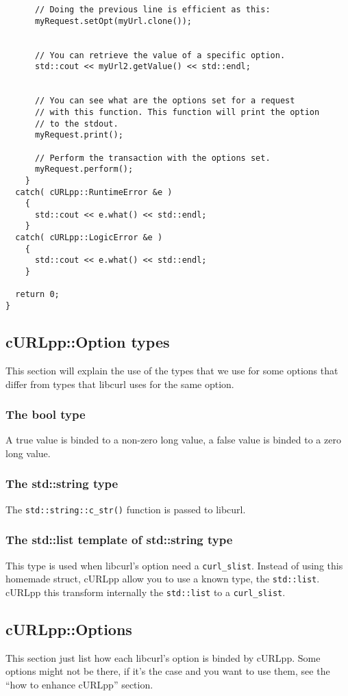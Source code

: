 \documentclass{article}
\begin{document}
\begin{verbatim}
      // Doing the previous line is efficient as this:
      myRequest.setOpt(myUrl.clone());

      
      // You can retrieve the value of a specific option.
      std::cout << myUrl2.getValue() << std::endl;


      // You can see what are the options set for a request
      // with this function. This function will print the option
      // to the stdout.
      myRequest.print();
    
      // Perform the transaction with the options set.
      myRequest.perform();
    }
  catch( cURLpp::RuntimeError &e )
    {
      std::cout << e.what() << std::endl;
    }
  catch( cURLpp::LogicError &e )
    {
      std::cout << e.what() << std::endl;
    }
    
  return 0;
}
\end{verbatim}



\subsection{cURLpp::Option types}
This section will explain the use of the types that we use for 
some options that differ from types that libcurl uses for the
same option.

\subsubsection{The bool type}
A true value is binded to a non-zero long value, a false value
is binded to a zero long value.

\subsubsection{The std::string type}
The \verb+std::string::c_str()+ function is passed to libcurl.

\subsubsection{The std::list template of std::string type}
This type is used when libcurl's option need a \verb+curl_slist+. Instead of
using this homemade struct, cURLpp allow you to use a known type, the 
\verb+std::list+. cURLpp this transform internally the \verb+std::list+
to a \verb+curl_slist+.

\subsection{cURLpp::Options}
This section just list how each libcurl's option is binded by cURLpp.
Some options might not be there, if it's the case and you want to use them,
see the ``how to enhance cURLpp'' section.
\end{document}
